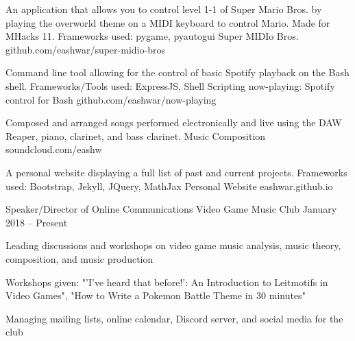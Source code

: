 \documentclass[]{awesome-cv}
\begin{document}
\vspace{-6mm}
\vspace{-3mm}

	\cventry
	{An application that allows you to control level 1-1 of Super Mario Bros. by playing the overworld theme on a MIDI keyboard to control Mario. Made for MHacks 11. Frameworks used: pygame, pyautogui}
	{Super MIDIo Bros.}
	{github.com/eashwar/super-midio-bros}
	{}
	{}

	\vspace{-6mm}
	\cventry
	{Command line tool allowing for the control of basic Spotify playback on the Bash shell. Frameworks/Tools used: ExpressJS, Shell Scripting}
	{now-playing: Spotify control for Bash}
	{github.com/eashwar/now-playing}
	{}
	{}
	
	\vspace{-6mm}
	\cventry
	{Composed and arranged songs performed electronically and live using the DAW Reaper, piano, clarinet, and bass clarinet.}
	{Music Composition}
	{soundcloud.com/eashw}
	{}
	{}
	
	\vspace{-6mm}
	\cventry
	{A personal website displaying a full list of past and current projects. Frameworks used: Bootstrap, Jekyll, JQuery, MathJax}
	{Personal Website}
	{eashwar.github.io}
	{}
	{}
	
	\vspace{-6mm}

\vspace{-2mm}
\vspace{-3mm}
	\cventry
	{Speaker/Director of Online Communications}
	{Video Game Music Club}
	{}
	{January 2018 – Present}
	{\begin{cvitems}
		\item {Leading discussions and workshops on video game music analysis, music theory, composition, and music production}
		\item {Workshops given: "'I've heard that before!': An Introduction to Leitmotifs in Video Games", "How to Write a Pokemon Battle Theme in 30 minutes"}
		\item {Managing mailing lists, online calendar, Discord server, and social media for the club}
		\end{cvitems}}
\end{document}
